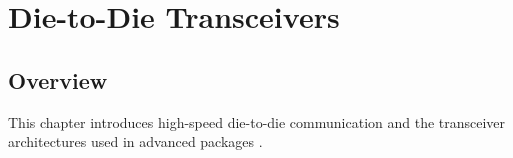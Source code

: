\chapter{Die-to-Die Transceivers}

\section{Overview}

This chapter introduces high-speed die-to-die communication
and the transceiver architectures used in advanced packages
\citep{palermo2025ecen720}.





